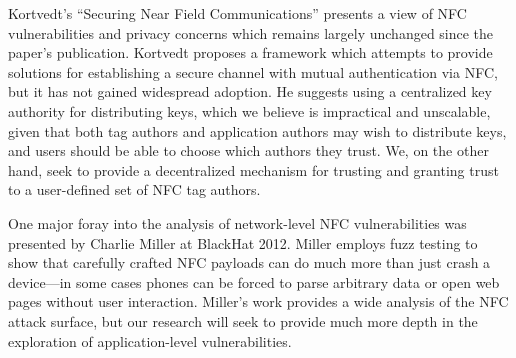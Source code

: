 \documentclass[12pt]{article}
\begin{document}
Kortvedt's ``Securing Near Field Communications''\cite{kortvedt2009} presents a view of NFC vulnerabilities and privacy concerns which remains largely unchanged since the paper's publication.
Kortvedt proposes a framework which attempts to provide solutions for establishing a secure channel with mutual authentication via NFC, but it has not gained widespread adoption.
He suggests using a centralized key authority for distributing keys, which we believe is impractical and unscalable, given that both tag authors and application authors may wish to distribute keys, and users should be able to choose which authors they trust.
We, on the other hand, seek to provide a decentralized mechanism for trusting and granting trust to a user-defined set of NFC tag authors.

One major foray into the analysis of network-level NFC vulnerabilities was presented by Charlie Miller at BlackHat 2012\cite{miller2012}.
Miller employs fuzz testing to show that carefully crafted NFC payloads can do much more than just crash a device---in some cases phones can be forced to parse arbitrary data or open web pages without user interaction.
Miller's work provides a wide analysis of the NFC attack surface, but our research will seek to provide much more depth in the exploration of application-level vulnerabilities.
\end{document}
